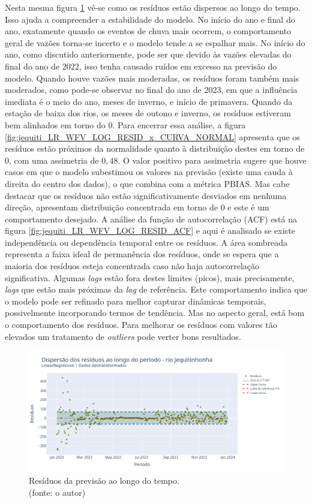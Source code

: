Nesta mesma figura \ref{fig:jequiti_LR_WFV_LOG_RESID_x_TEMPO} vê-se como os resíduos estão dispersos ao longo do tempo. Isso ajuda a compreender a estabilidade do modelo. No início do ano e final do ano, exatamente quando os eventos de chuva mais ocorrem, o comportamento geral de vazões torna-se incerto e o modelo tende a se espalhar mais. No início do ano, como discutido anteriormente, pode ser que devido às vazões elevadas do final do ano de $2022$, isso tenha causado ruídos em excesso na previsão do modelo. Quando houve vazões mais moderadas, os resíduos foram também mais moderados, como pode-se observar no final do ano de 2023, em que a influência imediata é o meio do ano, meses de inverno, e início de primavera. Quando da estação de baixa dos rios, os meses de outono e inverno, os resíduos estiveram bem alinhados em torno do $0$. Para encerrar essa análise, a figura \ref{fig:jequiti_LR_WFV_LOG_RESID_x_CURVA_NORMAL} apresenta que os resíduos estão próximos da normalidade quanto à distribuição destes em torno de $0$, com uma assimetria de $0,48$. O valor positivo para assimetria sugere que houve casos em que o modelo subestimou os valores na previsão (existe uma cauda à direita do centro dos dados), o que combina com a métrica PBIAS. Mas cabe destacar que os resíduos não estão significativamente desviados em nenhuma direção, apresentam distribuição concentrada em torno de $0$ e este é um comportamento desejado. A análise da função de autocorrelação (ACF) está na figura \ref{fig:jequiti_LR_WFV_LOG_RESID_ACF} e aqui é analisado se existe independência ou dependência temporal entre os resíduos. A área sombreada representa a faixa ideal de permanência dos resíduos, onde se espera que a maioria dos resíduos esteja concentrada caso não haja autocorrelação significativa. Algumas \textit{lags} estão fora destes limites (picos), mais precisamente, \textit{lags} que estão mais próximas da \textit{lag} de referência. Este comportamento indica que o modelo pode ser refinado para melhor capturar dinâmicas temporais, possivelmente incorporando termos de tendência. Mas no aspecto geral, está bom o comportamento dos resíduos. Para melhorar os resíduos com valores tão elevados um tratamento de \textit{outliers} pode verter bons resultados.

\begin{figure}[!h]
	\centering
	\includegraphics[scale=0.33]{Figuras/jequiti/wfv/LR/LR_WFV_LOG_RESID_x_TEMPO.png}
	\caption{Resíduos da previsão ao longo do tempo.\\(fonte: o autor)}
	\label{fig:jequiti_LR_WFV_LOG_RESID_x_TEMPO}
\end{figure}

